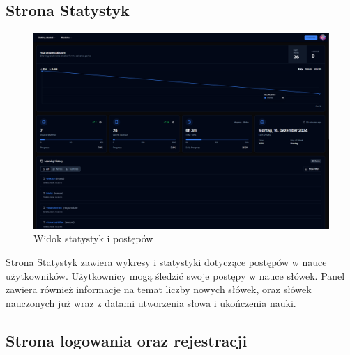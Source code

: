 \subsection{Strona Statystyk}

\begin{figure}[H]
    \centering
    \includegraphics[width=1\textwidth]{IMAGE/Progress.png}
    \caption{Widok statystyk i postępów}
    \label{fig:Statystyki postępów}
\end{figure}
Strona Statystyk zawiera wykresy i statystyki dotyczące postępów w nauce użytkowników. Użytkownicy mogą śledzić swoje postępy w nauce słówek. Panel zawiera również informacje na temat liczby nowych słówek, oraz słówek nauczonych już wraz z datami utworzenia słowa i ukończenia nauki.
\subsection{Strona logowania oraz rejestracji}

